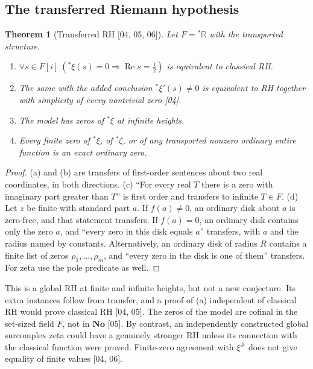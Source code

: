\documentclass[11pt,a4paper]{article}
\numberwithin{equation}{section}
\newtheorem{theorem}{Theorem}[section]
\theoremstyle{definition}
\theoremstyle{remark}
\newcommand{\No}{\mathbf{No}}
\newcommand{\R}{\mathbb R}
\renewcommand{\Re}{\operatorname{Re}}
\newcommand{\xip}{\xi^{\#}}
\newcommand{\src}[1]{\textup{[#1]}}
\begin{document}
\subsection{The transferred Riemann hypothesis}
\begin{theorem}[Transferred RH \src{04, 05, 06}]\label{gz:thm:RHstar}
Let $F={}^*\R$ with the transported structure.
\begin{enumerate}[label=(\alph*)]
\item $\forall s\in F[i]\ ({}^*\xi(s)=0\Rightarrow\Re s=\tfrac12)$ is equivalent
 to classical RH.
\item The same with the added conclusion ${}^*\xi'(s)\ne0$ is equivalent to RH
 together with simplicity of every nontrivial zero \src{04}.
\item The model has zeros of ${}^*\xi$ at infinite heights.
\item Every finite zero of ${}^*\xi$, of ${}^*\zeta$, or of any transported
 nonzero ordinary entire function is an exact ordinary zero.
\end{enumerate}
\end{theorem}
\begin{proof}
(a) and (b) are transfers of first-order sentences about two real
coordinates, in both directions. (c) ``For every real $T$ there is a zero with
imaginary part greater than $T$'' is first order and transfers to infinite
$T\in F$. (d) Let $z$ be finite with standard part $a$. If $f(a)\ne0$, an
ordinary disk about $a$ is zero-free, and that statement transfers. If
$f(a)=0$, an ordinary disk contains only the zero $a$, and ``every zero in
this disk equals $a$'' transfers, with $a$ and the radius named by
constants. Alternatively, an ordinary disk of radius $R$ contains a finite
list of zeros $\rho_1,\dots,\rho_m$, and ``every zero in the disk is one of
them'' transfers. For zeta use the pole predicate as well.
\end{proof}
This is a global RH at finite and infinite heights, but not a new conjecture.
Its extra instances follow from transfer, and a proof of (a) independent of
classical RH would prove classical RH \src{04, 05}. The zeros of the model
are cofinal in the set-sized field $F$, not in $\No$ \src{05}. By contrast,
an independently constructed global surcomplex zeta could have a genuinely
stronger RH unless its connection with the classical function were proved.
Finite-zero agreement with $\xip$ does not give equality of finite values
\src{04, 06}.
\end{document}
